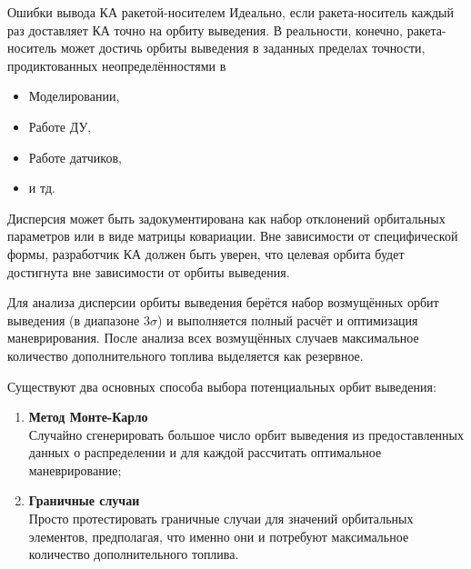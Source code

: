 \documentclass[8pt]{beamer}
\begin{document}
\begin{frame}{Ошибки вывода КА ракетой-носителем}
Идеально, если ракета-носитель каждый раз доставляет КА точно на орбиту выведения. В реальности, конечно, ракета-носитель может достичь орбиты выведения в заданных пределах точности, продиктованных неопределённостями в 
\begin{itemize}
    \item Моделировании,
    \item Работе ДУ,
    \item Работе датчиков,
    \item и тд.
\end{itemize}
Дисперсия может быть задокументирована как набор отклонений орбитальных параметров или в виде матрицы ковариации. Вне зависимости от специфической формы, разработчик КА должен быть уверен, что целевая орбита будет достигнута вне зависимости от орбиты выведения.

Для анализа дисперсии орбиты выведения берётся набор возмущённых орбит выведения (в диапазоне $3 \sigma$) и выполняется полный расчёт и оптимизация маневрирования. После анализа всех возмущённых случаев максимальное количество дополнительного топлива выделяется как резервное.

Существуют два основных способа выбора потенциальных орбит выведения:
\begin{enumerate}
    \item \textbf{Метод Монте-Карло} \\
    Случайно сгенерировать большое число орбит выведения из предоставленных данных о распределении и для каждой рассчитать оптимальное маневрирование;

    \item \textbf{Граничные случаи} \\
    Просто протестировать граничные случаи для значений орбитальных элементов, предполагая, что именно они и потребуют максимальное количество дополнительного топлива. 
\end{enumerate}
\end{frame}
\end{document}

